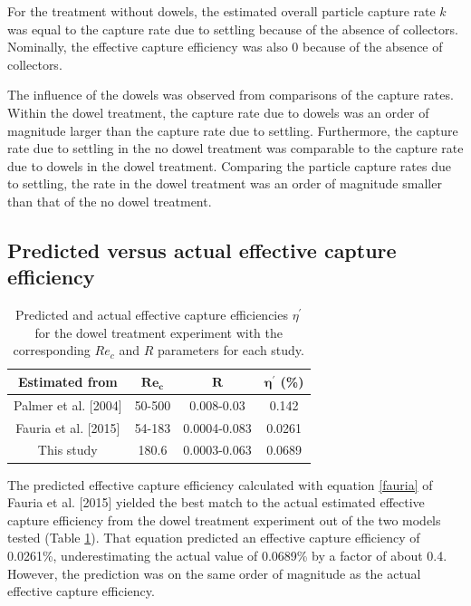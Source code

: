 \documentclass[12pt]{article}
\begin{document}
For the treatment without dowels, the estimated overall particle capture rate $k$ was equal to the capture rate due to settling because of the absence of collectors. Nominally, the effective capture efficiency was also 0 because of the absence of collectors.

The influence of the dowels was observed from comparisons of the capture rates. Within the dowel treatment, the capture rate due to dowels was an order of magnitude larger than the capture rate due to settling. Furthermore, the capture rate due to settling in the no dowel treatment was comparable to the capture rate due to dowels in the dowel treatment. Comparing the particle capture rates due to settling, the rate in the dowel treatment was an order of magnitude smaller than that of the no dowel treatment.

\subsection{Predicted versus actual effective capture efficiency}

\begin{table}[H]
    \centering
    \caption{Predicted and actual effective capture efficiencies $\eta^\prime$ for the dowel treatment experiment with the corresponding $Re_c$ and $R$ parameters for each study.}
    \label{tab_ececomparison}
    \begin{tabular}{c c c c}
        \textbf{Estimated from} & $\boldsymbol{Re_c}$ & $\boldsymbol{R}$ & $\boldsymbol{\eta^\prime}$ (\%) \\
        \hline
        Palmer et al. [2004] & 50-500 & 0.008-0.03 & 0.142 \\
        \hline
        Fauria et al. [2015] & 54-183 & 0.0004-0.083 & 0.0261 \\
        \hline
        This study & 180.6 & 0.0003-0.063 & 0.0689 \\
        \hline
    \end{tabular}
\end{table}

The predicted effective capture efficiency calculated with equation \ref{fauria} of Fauria et al. [2015] yielded the best match to the actual estimated effective capture efficiency from the dowel treatment experiment out of the two models tested (Table \ref{tab_ececomparison}). That equation predicted an effective capture efficiency of 0.0261\%, underestimating the actual value of 0.0689\% by a factor of about 0.4. However, the prediction was on the same order of magnitude as the actual effective capture efficiency.
\end{document}
